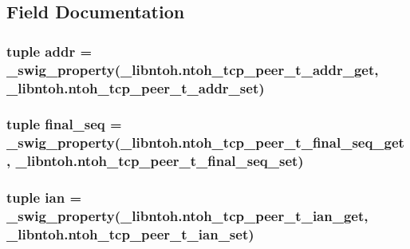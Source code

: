 \subsection{Field Documentation}
\hypertarget{classlibntoh_1_1ntoh__tcp__peer__t_a2173c231c978de69ce30d0430739f1a1}{
\subsubsection[{addr}]{\setlength{\rightskip}{0pt plus 5cm}tuple addr = {\bf \-\_\-swig\-\_\-property}(\-\_\-libntoh.\-ntoh\-\_\-tcp\-\_\-peer\-\_\-t\-\_\-addr\-\_\-get, \-\_\-libntoh.\-ntoh\-\_\-tcp\-\_\-peer\-\_\-t\-\_\-addr\-\_\-set)\hspace{0.3cm}{\ttfamily [static]}}}\label{classlibntoh_1_1ntoh__tcp__peer__t_a2173c231c978de69ce30d0430739f1a1}
\hypertarget{classlibntoh_1_1ntoh__tcp__peer__t_acfbf6a8704c9a239a68087d6340fc2ab}{
\subsubsection[{final\-\_\-seq}]{\setlength{\rightskip}{0pt plus 5cm}tuple final\-\_\-seq = {\bf \-\_\-swig\-\_\-property}(\-\_\-libntoh.\-ntoh\-\_\-tcp\-\_\-peer\-\_\-t\-\_\-final\-\_\-seq\-\_\-get, \-\_\-libntoh.\-ntoh\-\_\-tcp\-\_\-peer\-\_\-t\-\_\-final\-\_\-seq\-\_\-set)\hspace{0.3cm}{\ttfamily [static]}}}\label{classlibntoh_1_1ntoh__tcp__peer__t_acfbf6a8704c9a239a68087d6340fc2ab}
\hypertarget{classlibntoh_1_1ntoh__tcp__peer__t_a6df1b754c46aba0b045b242e7db0fc73}{
\subsubsection[{ian}]{\setlength{\rightskip}{0pt plus 5cm}tuple ian = {\bf \-\_\-swig\-\_\-property}(\-\_\-libntoh.\-ntoh\-\_\-tcp\-\_\-peer\-\_\-t\-\_\-ian\-\_\-get, \-\_\-libntoh.\-ntoh\-\_\-tcp\-\_\-peer\-\_\-t\-\_\-ian\-\_\-set)\hspace{0.3cm}{\ttfamily [static]}}}\label{classlibntoh_1_1ntoh__tcp__peer__t_a6df1b754c46aba0b045b242e7db0fc73}
